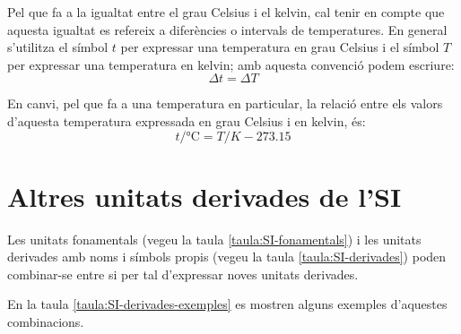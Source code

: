    
    
 
   
  
   
     
\index{\unit{\ohm}}    
\index{\unit{\degreeCelsius}}    

Pel que fa a la igualtat entre el grau Celsius i el kelvin, cal tenir en compte que aquesta igualtat es refereix a diferències o intervals de temperatures. En general s'utilitza el símbol $t$ per expressar una temperatura en grau Celsius i el símbol $T$ per expressar una temperatura en kelvin; amb aquesta convenció podem escriure:
\begin{equation}
	\Delta t = \Delta T
\end{equation}

En canvi, pel que fa a una temperatura en particular, la relació entre els valors d'aquesta temperatura expressada en grau Celsius i en kelvin, és:
\begin{equation}
	t / \unit{\degreeCelsius} = T / \unit{K} - \num{273,15}
\end{equation}


\section{Altres unitats derivades de l'SI}

Les unitats fonamentals (vegeu la taula \vref{taula:SI-fonamentals}) i les unitats derivades amb noms i símbols propis (vegeu la taula \vref{taula:SI-derivades}) poden combinar-se entre si per tal d'expressar noves unitats derivades.

 En la taula \vref{taula:SI-derivades-exemples} es mostren alguns exemples d'aquestes combinacions.

